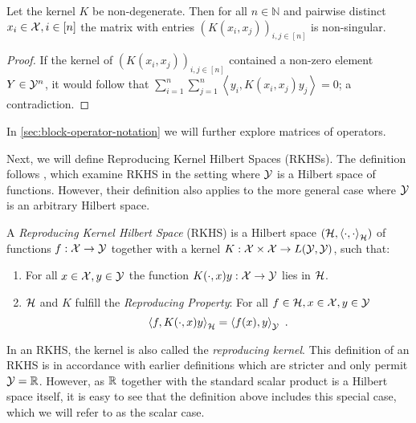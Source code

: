 \begin{lemma}
	\label{lem:kernel-non-singular}
	Let the kernel $K$ be non-degenerate.
	Then for all $n \in \mathbb{N}$ and pairwise distinct $x_i \in \mathcal{X}, i \in [n]$ the matrix with entries $(K(x_i, x_j))_{i, j \in [n]}$ is non-singular.
\end{lemma}
\begin{proof}
	If the kernel of $(K(x_i, x_j))_{i, j \in [n]}$ contained a non-zero element $Y \in \mathcal{Y}^n$, it would follow that $\sum_{i=1}^n \sum_{j=1}^n \left< y_i, K(x_i, x_j)  y_j\right> = 0$; a contradiction.
\end{proof}
In \cref{sec:block-operator-notation} we will further explore matrices of operators.

Next, we will define Reproducing Kernel Hilbert Spaces (RKHSs).
The definition follows \citet{kadri16}, which examine RKHS in the setting where $\mathcal{Y}$ is a Hilbert space of functions.
However, their definition also applies to the more general case where $\mathcal{Y}$ is an arbitrary Hilbert space.
\begin{definition}
	\label{def:rkhs}
	A \emph{Reproducing Kernel Hilbert Space} (RKHS) is a Hilbert space $(\mathcal{H}, \left<\cdot, \cdot\right>_{\mathcal{H}})$ of functions $f: \mathcal{X} \rightarrow \mathcal{Y}$ together with a kernel $K: \mathcal{X} \times \mathcal{X} \rightarrow L(\mathcal{Y}, \mathcal{Y})$, such that:
	\begin{enumerate}
		\item For all $x\in \mathcal{X}, y \in \mathcal{Y}$ the function $K(\cdot, x) y: \mathcal{X} \rightarrow \mathcal{Y}$ lies in $\mathcal{H}$.
		\item $\mathcal{H}$ and $K$ fulfill the \emph{Reproducing Property}: For all $f \in \mathcal{H}, x \in \mathcal{X}, y \in \mathcal{Y}$
		\begin{equation}
			\label{eq:reproducing-property}
			\left< f, K(\cdot, x) y \right>_{\mathcal{H}} = \left< f(x), y\right>_{\mathcal{Y}} \ .
		\end{equation}
	\end{enumerate}
\end{definition}

In an RKHS, the kernel is also called the \emph{reproducing kernel}.
This definition of an RKHS is in accordance with earlier definitions \cite{berlinet04, sejdinovic12} which are stricter and only permit $\mathcal{Y} = \mathbb{R}$.
However, as $\mathbb{R}$ together with the standard scalar product is a Hilbert space itself, it is easy to see that the definition above includes this special case, which we will refer to as the scalar case.

